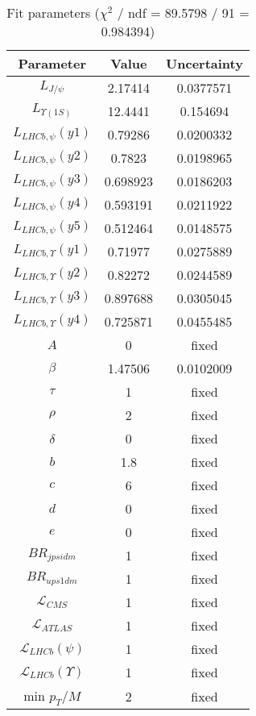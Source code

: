 \begin{table}
\centering
\begin{tabular}{c|c|c}
Parameter & Value & Uncertainty \\
\hline
$L_{J/\psi}$ & 2.17414 & 0.0377571 \\
$L_{\Upsilon(1S)}$ & 12.4441 & 0.154694 \\
$L_{LHCb,\psi}(y1)$ & 0.79286 & 0.0200332 \\
$L_{LHCb,\psi}(y2)$ & 0.7823 & 0.0198965 \\
$L_{LHCb,\psi}(y3)$ & 0.698923 & 0.0186203 \\
$L_{LHCb,\psi}(y4)$ & 0.593191 & 0.0211922 \\
$L_{LHCb,\psi}(y5)$ & 0.512464 & 0.0148575 \\
$L_{LHCb,\Upsilon}(y1)$ & 0.71977 & 0.0275889 \\
$L_{LHCb,\Upsilon}(y2)$ & 0.82272 & 0.0244589 \\
$L_{LHCb,\Upsilon}(y3)$ & 0.897688 & 0.0305045 \\
$L_{LHCb,\Upsilon}(y4)$ & 0.725871 & 0.0455485 \\
$A$ & 0 & fixed \\
$\beta$ & 1.47506 & 0.0102009 \\
$\tau$ & 1 & fixed \\
$\rho$ & 2 & fixed \\
$\delta$ & 0 & fixed \\
$b$ & 1.8 & fixed \\
$c$ & 6 & fixed \\
$d$ & 0 & fixed \\
$e$ & 0 & fixed \\
$BR_{jpsidm}$ & 1 & fixed \\
$BR_{ups1dm}$ & 1 & fixed \\
$\mathcal L_{CMS}$ & 1 & fixed \\
$\mathcal L_{ATLAS}$ & 1 & fixed \\
$\mathcal L_{LHCb}(\psi)$ & 1 & fixed \\
$\mathcal L_{LHCb}(\Upsilon)$ & 1 & fixed \\
min $p_T/M$ & 2 & fixed \\
\end{tabular}
\caption{Fit parameters ($\chi^2$ / ndf = 89.5798 / 91 = 0.984394)}
\end{table}
